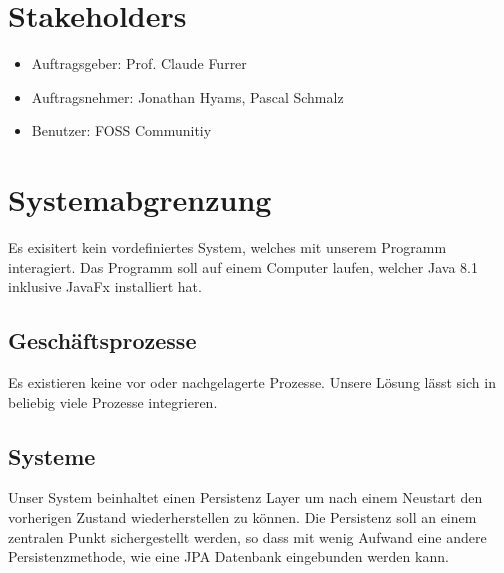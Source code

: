 \documentclass[11pt,titelpage]{scrartcl}
\begin{document}
\section{Stakeholders}
\begin{itemize}
\item{Auftragsgeber: Prof. Claude Furrer}
\item{Auftragsnehmer: Jonathan Hyams, Pascal Schmalz}
\item{Benutzer: FOSS Communitiy}
\end{itemize}
\section {Systemabgrenzung}
Es exisitert kein vordefiniertes System, welches mit unserem Programm interagiert.
Das Programm soll auf einem Computer laufen, welcher Java 8.1 inklusive JavaFx installiert hat.
 
\subsection{Geschäftsprozesse}
Es existieren keine vor\- oder nachgelagerte Prozesse. Unsere Lösung lässt sich in beliebig viele Prozesse integrieren.
\subsection{Systeme}
Unser System beinhaltet einen Persistenz Layer um nach einem Neustart den vorherigen Zustand wiederherstellen zu können.
Die Persistenz soll an einem zentralen Punkt sichergestellt werden, so dass mit wenig Aufwand eine andere
Persistenzmethode, wie eine JPA Datenbank eingebunden werden kann.
\end{document}

